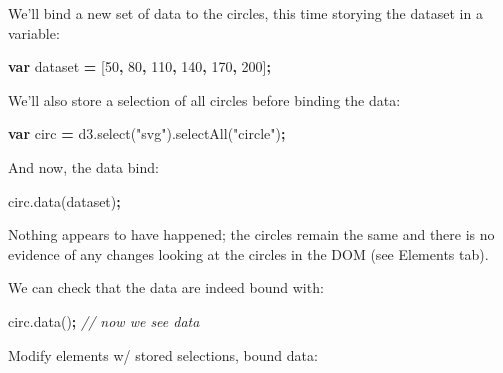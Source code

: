 \documentclass[openany]{book}
\newenvironment{Shaded}{\begin{snugshade}}{\end{snugshade}}
\newcommand{\AttributeTok}[1]{\textcolor[rgb]{0.77,0.63,0.00}{#1}}
\newcommand{\CommentTok}[1]{\textcolor[rgb]{0.56,0.35,0.01}{\textit{#1}}}
\newcommand{\DecValTok}[1]{\textcolor[rgb]{0.00,0.00,0.81}{#1}}
\newcommand{\KeywordTok}[1]{\textcolor[rgb]{0.13,0.29,0.53}{\textbf{#1}}}
\newcommand{\NormalTok}[1]{#1}
\newcommand{\OperatorTok}[1]{\textcolor[rgb]{0.81,0.36,0.00}{\textbf{#1}}}
\newcommand{\StringTok}[1]{\textcolor[rgb]{0.31,0.60,0.02}{#1}}
\newcommand{\VariableTok}[1]{\textcolor[rgb]{0.00,0.00,0.00}{#1}}
\begin{document}
We'll bind a new set of data to the circles, this time storying the dataset in a variable:

\begin{Shaded}
\begin{Highlighting}[]
\KeywordTok{var}\NormalTok{ dataset }\OperatorTok{=}\NormalTok{ [}\DecValTok{50}\OperatorTok{,} \DecValTok{80}\OperatorTok{,} \DecValTok{110}\OperatorTok{,} \DecValTok{140}\OperatorTok{,} \DecValTok{170}\OperatorTok{,} \DecValTok{200}\NormalTok{]}\OperatorTok{;}
\end{Highlighting}
\end{Shaded}

We'll also store a selection of all circles before binding the data:

\begin{Shaded}
\begin{Highlighting}[]
\KeywordTok{var}\NormalTok{ circ }\OperatorTok{=} \VariableTok{d3}\NormalTok{.}\AttributeTok{select}\NormalTok{(}\StringTok{"svg"}\NormalTok{).}\AttributeTok{selectAll}\NormalTok{(}\StringTok{"circle"}\NormalTok{)}\OperatorTok{;}
\end{Highlighting}
\end{Shaded}

And now, the data bind:

\begin{Shaded}
\begin{Highlighting}[]
\VariableTok{circ}\NormalTok{.}\AttributeTok{data}\NormalTok{(dataset)}\OperatorTok{;}
\end{Highlighting}
\end{Shaded}

Nothing appears to have happened; the circles remain the same and there is no evidence of any changes looking at the circles in the DOM (see Elements tab).

We can check that the data are indeed bound with:

\begin{Shaded}
\begin{Highlighting}[]
\VariableTok{circ}\NormalTok{.}\AttributeTok{data}\NormalTok{()}\OperatorTok{;}  \CommentTok{// now we see data}
\end{Highlighting}
\end{Shaded}

Modify elements w/ stored selections, bound data:
\end{document}
